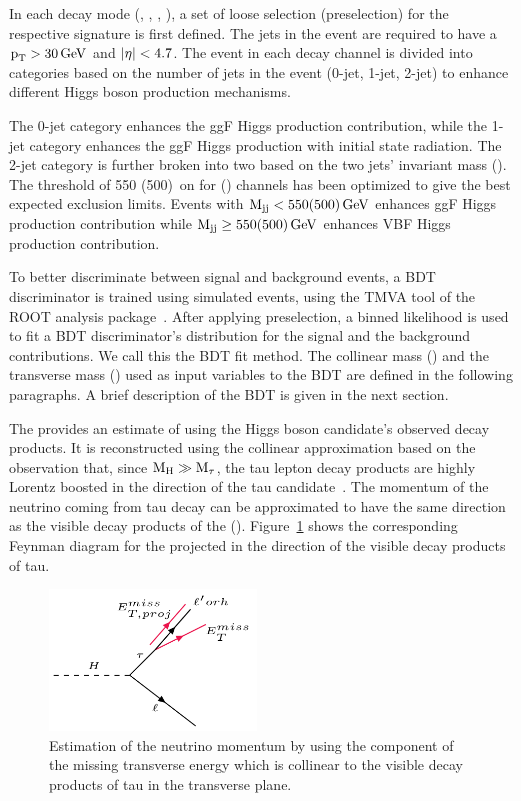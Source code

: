 In each decay mode (\emu, \ehad, \mue, \muhad), a set of loose selection (preselection) for the respective signature is first defined. The jets in the event are required to have a $\text{p}_\text{T} > 30 \,\text{Ge\hspace{-.08em}V}$ and $\lvert\eta\rvert < 4.7$. The event in each decay channel is divided into categories based on the number of jets in the event (0-jet, 1-jet, 2-jet) to enhance different Higgs boson production mechanisms.

The 0-jet category enhances the ggF Higgs production contribution, while the 1-jet category enhances the ggF Higgs production with initial state radiation. The 2-jet category is further broken into two based on the two jets' invariant mass (\mjj). The threshold of 550 (500)~\GeV on \mjj for \mutau(\etau) channels has been optimized to give the best expected exclusion limits. Events with $\text{M}_{\text{jj}} < 550(500) \,\text{Ge\hspace{-.08em}V}$ enhances ggF Higgs production contribution while $\text{M}_{\text{jj}} \ge 550(500) \,\text{Ge\hspace{-.08em}V}$ enhances VBF Higgs production contribution.

To better discriminate between signal and background events, a BDT discriminator is trained using simulated events, using the TMVA tool of the ROOT analysis package~\cite{Hocker:2007ht}. After applying preselection, a binned likelihood is used to fit a BDT discriminator's distribution for the signal and the background contributions. We call this the BDT fit method. The collinear mass (\mcol) and the transverse mass (\mtl) used as input variables to the BDT are defined in the following paragraphs. A brief description of the BDT is given in the next section.

The \mcol provides an estimate of \mh using the Higgs boson candidate's observed decay products. It is reconstructed using the collinear approximation based on the observation that, since $\text{M}_{\text{H}} \gg \text{M}_\tau$, the tau lepton decay products are highly Lorentz boosted in the direction of the tau candidate~\cite{Ellis:1987xu}. The momentum of the neutrino coming from tau decay can be approximated to have the same direction as the visible decay products of the \Pgt(\vectvis). Figure~\ref{fig:METproj} shows the corresponding Feynman diagram for the \met projected in the direction of the visible decay products of tau.

\begin{figure}[htbp]
  \centering
  \includegraphics[width=0.49\textwidth]{plots/chapter6/Feynman/METproj.png}
  \caption{Estimation of the neutrino momentum \metproj by using the component of the missing transverse energy \met which is collinear to the visible decay products of tau in the transverse plane.}
  \label{fig:METproj}
\end{figure}

